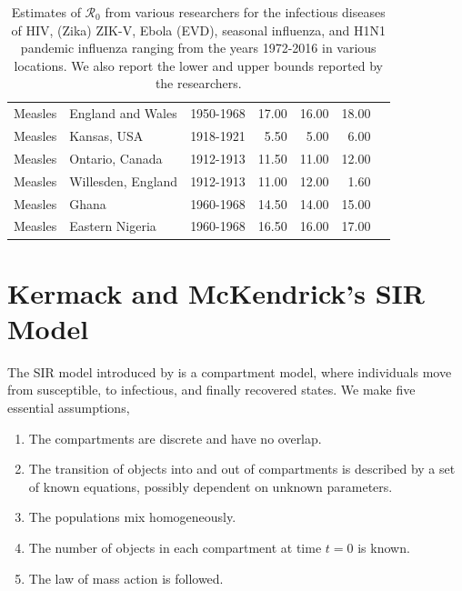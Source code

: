 \documentclass[12pt]{article}
\newcommand{\rr}{\ensuremath{\mathcal{R}_0}}
\begin{document}
\begin{landscape}
\begin{table}
\begin{tabular}{@{}lllrrrl@{}}
  Measles     & England and Wales                  & 1950-1968                          & 17.00      & 16.00          & 18.00         & \cite{anderson1992}     \\
  Measles     & Kansas, USA                  & 1918-1921                          & 5.50    & 5.00          & 6.00          & \cite{anderson1992}     \\
  Measles     & Ontario, Canada                  & 1912-1913                         & 11.50        & 11.00           & 12.00            & \cite{anderson1992}     \\
  Measles     & Willesden, England                  & 1912-1913                          & 11.00        & 12.00       & 1.60            & \cite{anderson1992}     \\
  Measles     & Ghana                 & 1960-1968                          & 14.50       & 14.00          & 15.00            & \cite{anderson1992}     \\
  Measles     & Eastern Nigeria                  & 1960-1968                          & 16.50        & 16.00          & 17.00           & \cite{anderson1992}     \\
\bottomrule
\end{tabular}
\caption{Estimates of $\rr$ from various researchers for the infectious diseases of HIV, (Zika) ZIK-V, Ebola (EVD), seasonal influenza, and H1N1 pandemic influenza ranging from the years 1972-2016 in various locations.  We also report the lower and upper bounds reported by the researchers.}
\label{tab:r0-real-ex}
\end{table}
\end{landscape}



\section{Kermack and McKendrick's SIR Model}
\label{sec:sir-intro}

The SIR model introduced by \cite{Kermack700} is a compartment model, where individuals move from susceptible, to infectious, and finally recovered states.  We make five essential assumptions,
\begin{enumerate}
\item The compartments are discrete and have no overlap.
\item The transition of objects into and out of compartments is described by a set of known equations, possibly dependent on unknown parameters.
\item The populations mix homogeneously.
\item The number of objects in each compartment at time $t=0$ is known.
  \item The law of mass action is followed.
  \end{enumerate}  
\end{document}
